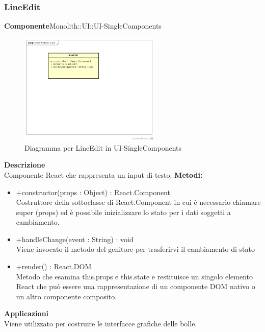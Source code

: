 \subsubsection{LineEdit}
\textbf{Componente}Monolith::UI::UI-SingleComponents\\
   \FloatBarrier
   \begin{figure}[ht]
   \centering
   \includegraphics[width=0.6\textwidth]{img/single-LineEdit}
   \caption{{Diagramma per LineEdit in UI-SingleComponents}}
\end{figure}
\FloatBarrier
\textbf{Descrizione}\\
Componente React che rappresenta un input di testo.
\textbf{Metodi:} \begin{itemize}\item +constructor(props : Object) : React.Component \\Costruttore della sottoclasse di React.Component in cui è necessario chiamare super (props) ed è possibile inizializzare lo stato per i dati soggetti a cambiamento.\item +handleChange(event : String) : void  \\Viene invocato il metodo del genitore per trasferirvi il cambiamento di stato\item +render() : React.DOM \\Metodo che esamina this.props e this.state e restituisce un singolo elemento React che può essere una rappresentazione di un componente DOM nativo o un altro componente composito.\end{itemize} 


\textbf{Applicazioni}\\
Viene utilizzato per costruire le interfacce grafiche delle bolle. 


\clearpage

